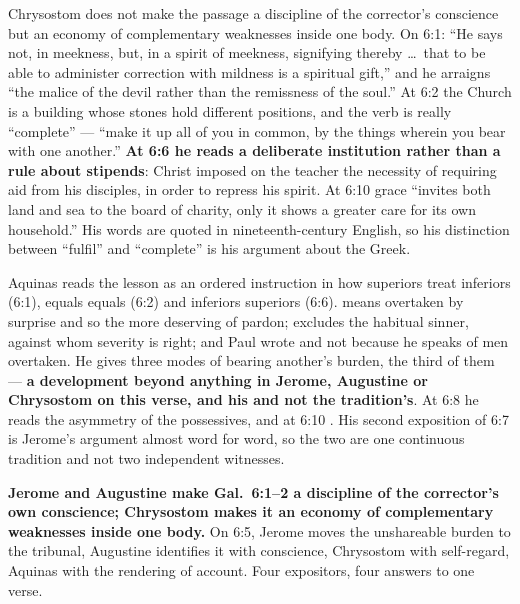 \begin{witnessnote}
 Chrysostom does not make the passage a discipline of the
corrector's conscience but an economy of complementary weaknesses inside one
body. On 6:1: ``He says not, in meekness, but, in a spirit of meekness, signifying
thereby \dots\ that to be able to administer correction with mildness is a
spiritual gift,'' and he arraigns ``the malice of the devil rather than the
remissness of the soul.'' At 6:2 the Church is a building whose stones hold
different positions, and the verb is really ``complete'' --- ``make it up all of
you in common, by the things wherein you bear with one another.'' \textbf{At 6:6
he reads a deliberate institution rather than a rule about stipends}: Christ
imposed on the teacher the necessity of requiring aid from his disciples, in order
to repress his spirit. At 6:10 grace ``invites both land and sea to the board of
charity, only it shows a greater care for its own household.'' His words are
quoted in nineteenth-century English, so his distinction between ``fulfil'' and ``complete''
is his argument about the Greek.
\end{witnessnote}

\begin{witnessnote}
Aquinas reads the lesson as an ordered instruction in how superiors treat
inferiors (6:1), equals equals (6:2) and inferiors superiors (6:6).
 means overtaken by surprise and so the more deserving of
pardon;  excludes the habitual sinner, against whom severity is
right; and Paul wrote  and not  because he
speaks of men overtaken. He gives three modes of bearing another's burden, the
third of them  --- \textbf{a development beyond anything in Jerome, Augustine or
Chrysostom on this verse, and his and not the tradition's}. At 6:8 he reads the
asymmetry of the possessives, and at 6:10 . His second exposition of 6:7 is Jerome's
argument almost word for word, so the two are one continuous tradition and not two
independent witnesses.
\end{witnessnote}

\textbf{Jerome and Augustine make Gal.\ 6:1--2 a discipline of the corrector's own
conscience; Chrysostom makes it an economy of complementary weaknesses inside one
body.} On 6:5, Jerome moves
the unshareable burden to the tribunal, Augustine identifies it with conscience,
Chrysostom with self-regard, Aquinas with the rendering of account. Four
expositors, four answers to one verse.

